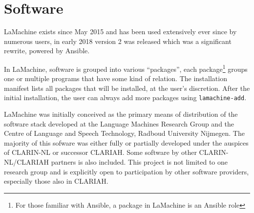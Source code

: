 \documentclass[a4paper,11pt]{article}
\begin{document}
\section{Software}

LaMachine exists since May 2015 and has been used extensively ever since by numerous users, in early 2018 version 2 was
released which was a significant rewrite, powered by Ansible.

In LaMachine, software is grouped into various ``packages'', each package\footnote{For those familiar with
Ansible, a package in LaMachine is an Ansible role} groups one or multiple programs that have some kind of relation. The
installation manifest lists all packages that will be installed, at the user's discretion. After the initial
installation, the user can always add more packages using \texttt{lamachine-add}.

LaMachine was initially conceived as the primary means of distribution of the software stack developed at the Language
Machines Research Group and the Centre of
Language and Speech Technology, Radboud University Nijmegen. The majority of this sofware was either fully or partially developed under the auspices of CLARIN-NL or successor
CLARIAH. Some software by other CLARIN-NL/CLARIAH partners is also included. This project is not limited to one research
group and is explicitly open to participation by other software providers, especially those
also in CLARIAH.
\end{document}
